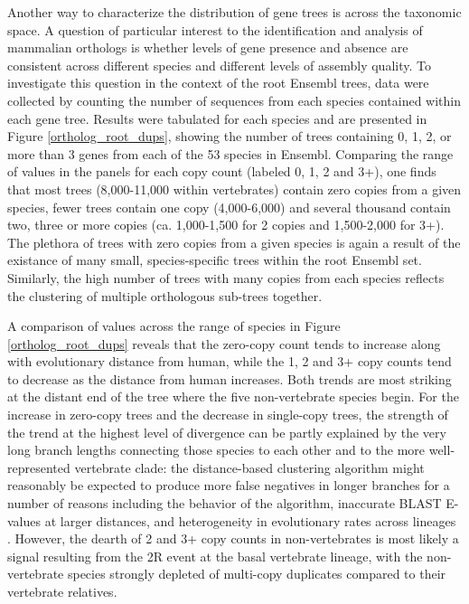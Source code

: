 Another way to characterize the distribution of gene trees is across
the taxonomic space. A question of particular interest to the
identification and analysis of mammalian orthologs is whether levels
of gene presence and absence are consistent across different species
and different levels of assembly quality. To investigate this question
in the context of the root Ensembl trees, data were collected by
counting the number of sequences from each species contained within
each gene tree. Results were tabulated for each species and are
presented in Figure \ref{ortholog_root_dups}, showing the number of
trees containing 0, 1, 2, or more than 3 genes from each of the 53
species in Ensembl. Comparing the range of values in the panels for
each copy count (labeled 0, 1, 2 and 3+), one finds that most trees
(8,000-11,000 within vertebrates) contain zero copies from a given
species, fewer trees contain one copy (4,000-6,000) and several
thousand contain two, three or more copies (ca. 1,000-1,500 for 2
copies and 1,500-2,000 for 3+). The plethora of trees with zero copies
from a given species is again a result of the existance of many small,
species-specific trees within the root Ensembl set. Similarly, the
high number of trees with many copies from each species reflects the
clustering of multiple orthologous sub-trees together.

A comparison of values across the range of species in Figure
\ref{ortholog_root_dups} reveals that the zero-copy count tends to
increase along with evolutionary distance from human, while the 1, 2
and 3+ copy counts tend to decrease as the distance from human
increases. Both trends are most striking at the distant end of the
tree where the five non-vertebrate species begin. For the increase in
zero-copy trees and the decrease in single-copy trees, the strength of
the trend at the highest level of divergence can be partly explained
by the very long branch lengths connecting those species to each other
and to the more well-represented vertebrate clade: the distance-based
clustering algorithm might reasonably be expected to produce more
false negatives in longer branches for a number of reasons including
the behavior of the \hclust algorithm, inaccurate BLAST E-values at
larger distances, and heterogeneity in evolutionary rates across
lineages \citep{Whelan2008}. However, the dearth of 2 and 3+ copy counts in
non-vertebrates is most likely a signal resulting from the 2R event at
the basal vertebrate lineage, with the non-vertebrate species strongly
depleted of multi-copy duplicates compared to their vertebrate
relatives.

